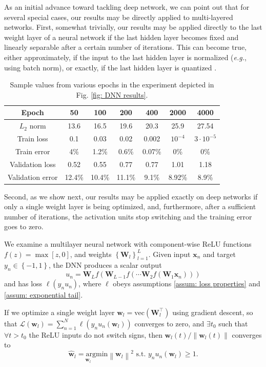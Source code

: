 \documentclass[twoside,11pt,english]{article}
\newcommand{\norm}[1]{\left\lVert{#1}\right\rVert}
\begin{document}
As an initial advance toward tackling deep network, we can point out
that for several special cases, our results may be directly applied to
multi-layered networks. First, somewhat trivially, our results
may be applied directly to the last weight layer of a neural network if the last
hidden layer becomes fixed and linearly separable after a certain
number of iterations. This can become true, either approximately,
if the input to the last hidden layer is normalized (\emph{e.g.},
using batch norm), or exactly, if the last hidden layer is quantized
\citep{Hubara2016}. 

\begin{table}
\begin{centering}
\begin{tabular}{|c|c|c|c|c|c|c|}
\hline 
Epoch  & 50  & 100  & 200  & 400  & 2000  & 4000\tabularnewline
\hline 
\hline 
$L_{2}$ norm  & 13.6  & 16.5  & 19.6  & 20.3  & 25.9  & 27.54\tabularnewline
\hline 
Train loss  & 0.1  & 0.03  & 0.02  & 0.002  & $10^{-4}$  & $3\cdot10^{-5}$\tabularnewline
\hline 
Train error  & 4\%  & 1.2\%  & 0.6\%  & 0.07\%  & 0\%  & 0\%\tabularnewline
\hline 
Validation loss  & 0.52  & 0.55  & 0.77  & 0.77  & 1.01  & 1.18\tabularnewline
\hline 
Validation error  & 12.4\%  & 10.4\%  & 11.1\%  & 9.1\%  & 8.92\%  & 8.9\% \tabularnewline
\hline 
\end{tabular}
\par\end{centering}
\caption{Sample values from various epochs in the experiment depicted in Fig.
\ref{fig: DNN results}. \label{tab:Sample-value-dnn}}
\end{table}

Second, as we show next, our results may be applied exactly on deep networks if only a single weight layer is being optimized, and, furthermore, after a sufficient number of iterations, the activation units stop switching and the training error goes to zero. 

\begin{corR}
We examine a multilayer neural network with component-wise ReLU functions
$f\left(z\right)=\max\left[z,0\right]$, and weights $\left\{ \mathbf{W}_{l}\right\} _{l=1}^{L}$.
Given input $\mathbf{x}_{n}$ and target $y_{n}\in\left\{ -1,1\right\} $,
the DNN produces a scalar output 
\[
u_{n}=\mathbf{W}_{L}f\left(\mathbf{W}_{L-1}f\left(\cdots\mathbf{W}_{2}f\left(\mathbf{W}_{1}\mathbf{x}_{n}\right)\right)\right)
\]
 and has loss $\ell\left(y_{n}u_{n}\right)$, where $\ell$ obeys
assumptions \ref{assum: loss properties} and \ref{assum: exponential tail}. 

If we optimize a single weight layer $\mathbf{w}_{l}=\mathrm{vec}\left(\mathbf{W}_{l}^{\top}\right)$ using gradient
descent, so that $\mathcal{L}\left(\mathbf{w}_{l}\right)=\mathcal{\sum}_{n=1}^{N}\ell\left(y_{n}u_{n}(\mathbf{w}_{l})\right)$
converges to zero, and $\exists t_{0}$ such that $\forall t>t_{0}$
the ReLU inputs do not switch signs, then $\mathbf{w}_{l}(t)/\norm{\mathbf{w}_{l}(t)}$
converges to 
\[
\underset{\mathbf{w}_{l}}{\hat{\mathbf{w}}_{l}=\mathrm{argmin}}\left\lVert \mathbf{w}_{l}\right\rVert ^{2}\,\,\mathrm{s.t.}\,\,y_{n}u_{n}(\mathbf{w}_{l})\geq1.
\]
\end{corR}
\end{document}
